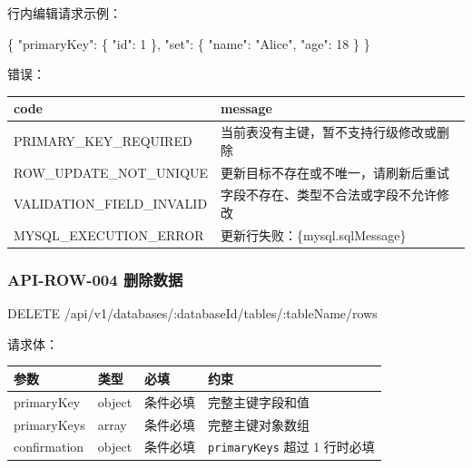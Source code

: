 \documentclass[
  a4paper,
  UTF8]{ctexart}
\newenvironment{Shaded}{}{}
\newcommand{\DataTypeTok}[1]{\textcolor[rgb]{0.56,0.13,0.00}{#1}}
\newcommand{\DecValTok}[1]{\textcolor[rgb]{0.25,0.63,0.44}{#1}}
\newcommand{\FunctionTok}[1]{\textcolor[rgb]{0.02,0.16,0.49}{#1}}
\newcommand{\NormalTok}[1]{#1}
\newcommand{\StringTok}[1]{\textcolor[rgb]{0.25,0.44,0.63}{#1}}
\begin{document}
行内编辑请求示例：

\begin{Shaded}
\begin{Highlighting}[]
\FunctionTok{\{}
  \DataTypeTok{"primaryKey"}\FunctionTok{:} \FunctionTok{\{}
    \DataTypeTok{"id"}\FunctionTok{:} \DecValTok{1}
  \FunctionTok{\},}
  \DataTypeTok{"set"}\FunctionTok{:} \FunctionTok{\{}
    \DataTypeTok{"name"}\FunctionTok{:} \StringTok{"Alice"}\FunctionTok{,}
    \DataTypeTok{"age"}\FunctionTok{:} \DecValTok{18}
  \FunctionTok{\}}
\FunctionTok{\}}
\end{Highlighting}
\end{Shaded}

错误：

\begin{longtable}[]{@{}ll@{}}
\toprule
code & message \\
\midrule
\endhead
PRIMARY\_KEY\_REQUIRED & 当前表没有主键，暂不支持行级修改或删除 \\
ROW\_UPDATE\_NOT\_UNIQUE & 更新目标不存在或不唯一，请刷新后重试 \\
VALIDATION\_FIELD\_INVALID & 字段不存在、类型不合法或字段不允许修改 \\
MYSQL\_EXECUTION\_ERROR & 更新行失败：\{mysql.sqlMessage\} \\
\bottomrule
\end{longtable}

\hypertarget{api-row-004-ux5220ux9664ux6570ux636e}{%
\subsubsection{API-ROW-004
删除数据}\label{api-row-004-ux5220ux9664ux6570ux636e}}

\begin{Shaded}
\begin{Highlighting}[]
\NormalTok{DELETE /api/v1/databases/:databaseId/tables/:tableName/rows}
\end{Highlighting}
\end{Shaded}

请求体：

\begin{longtable}[]{@{}llll@{}}
\toprule
参数 & 类型 & 必填 & 约束 \\
\midrule
\endhead
primaryKey & object & 条件必填 & 完整主键字段和值 \\
primaryKeys & array & 条件必填 & 完整主键对象数组 \\
confirmation & object & 条件必填 & \texttt{primaryKeys} 超过 1
行时必填 \\
\bottomrule
\end{longtable}
\end{document}
